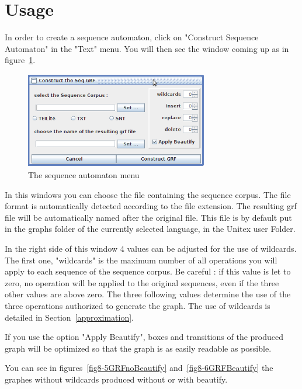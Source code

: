 \section{Usage}
In order to create a sequence automaton, click on "Construct Sequence Automaton" in the "Text" menu. You will then see the window coming up as in figure~\ref{fig8-0seq2grf1}.
\begin{figure}[h!]
	\begin{minipage}[h!]{0.5\linewidth}	
		\centering
			\includegraphics[width=8cm]{resources/img/fig8-0seq2grf1.png}
			\caption{The sequence automaton menu\label{fig8-0seq2grf1}}
	\end{minipage}
\end{figure}

\pagebreak
In this windows you can choose the file containing the sequence corpus. 
The file format is automatically detected according to the file extension.
The resulting grf file will be automatically named after the original file. This file is by default put in the graphs folder of the currently selected language, in the Unitex user Folder.
\medskip

\noindent In the right side of this window 4 values can be adjusted for the use of wildcards.
The first one, "wildcards" is the maximum number of all operations you will apply to each sequence of the sequence corpus.
\bigskip
\noindent Be careful : if this value is let to zero, no operation will be applied to the original sequences, even if the three other values are above zero. The three following values determine the use of the three operations authorized to generate the graph. The use of wildcards is detailed in Section~\ref{approximation}.
\medskip

If you use the option "Apply Beautify", boxes and transitions of the produced graph will be optimized so that the graph is as easily readable as possible.

\bigskip
\noindent You can see in figures~\ref{fig8-5GRFnoBeautify} and~\ref{fig8-6GRFBeautify} the graphes without wildcards produced without or with beautify.


